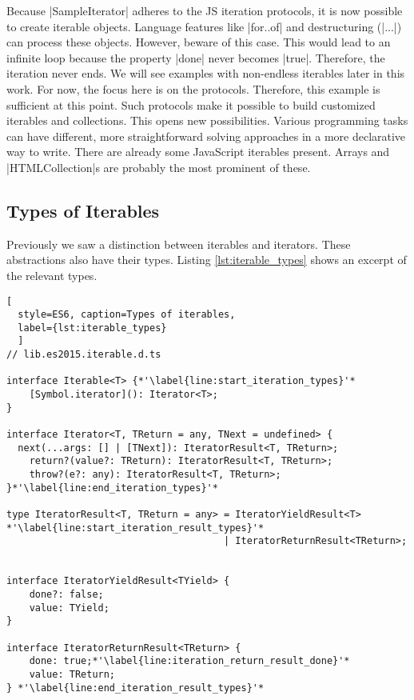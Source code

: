 Because |SampleIterator| adheres to the JS iteration protocols, it is now 
possible to create iterable objects. Language features like |for..of| and 
destructuring (|...|) can process these objects. However, beware of this 
case. This would lead to an infinite loop because the property |done| never 
becomes |true|. Therefore, the iteration never ends. We will see examples 
with non-endless iterables later in this work. 
For now, the focus here is on the protocols. Therefore, this 
example is sufficient at this point.
\newline
Such protocols make it possible to build customized iterables and
collections. This opens new possibilities. Various programming tasks can have 
different, more straightforward solving approaches in a more declarative way to
write.
There are already some JavaScript iterables present. Arrays and
|HTMLCollection|s are probably the most prominent of these.

\subsection{Types of Iterables}
\label{sub:Types of Iterables}
Previously we saw a distinction between iterables and iterators. These abstractions
also have their types. Listing \ref{lst:iterable_types} shows an excerpt of the
relevant types.

\begin{lstlisting}[
  style=ES6, caption=Types of iterables,
  label={lst:iterable_types}
  ]
// lib.es2015.iterable.d.ts

interface Iterable<T> {*'\label{line:start_iteration_types}'*
    [Symbol.iterator](): Iterator<T>;
}

interface Iterator<T, TReturn = any, TNext = undefined> {
  next(...args: [] | [TNext]): IteratorResult<T, TReturn>;
    return?(value?: TReturn): IteratorResult<T, TReturn>;
    throw?(e?: any): IteratorResult<T, TReturn>;
}*'\label{line:end_iteration_types}'*

type IteratorResult<T, TReturn = any> = IteratorYieldResult<T> *'\label{line:start_iteration_result_types}'*
                                      | IteratorReturnResult<TReturn>;


interface IteratorYieldResult<TYield> {
    done?: false;
    value: TYield;
}

interface IteratorReturnResult<TReturn> {
    done: true;*'\label{line:iteration_return_result_done}'*
    value: TReturn;
} *'\label{line:end_iteration_result_types}'*
\end{lstlisting}

